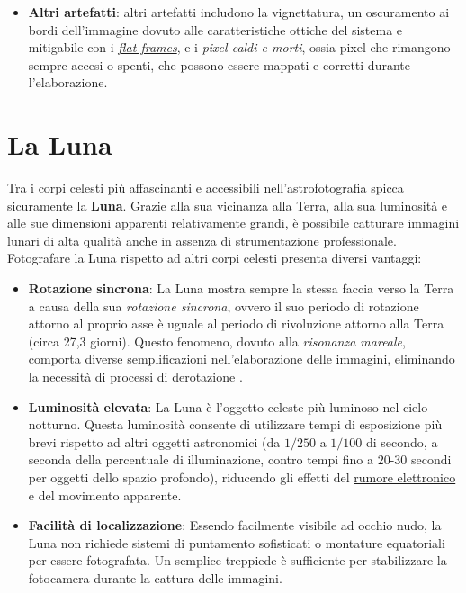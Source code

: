 \begin{itemize}
    \item \textbf{Altri artefatti}: altri artefatti includono la vignettatura, un oscuramento ai bordi dell'immagine dovuto alle caratteristiche ottiche del sistema e mitigabile con i \hyperref[subsec:flat]{\textit{flat frames}}, e i \textit{pixel caldi e morti},  ossia pixel che rimangono sempre accesi o spenti, che possono essere mappati e corretti durante l'elaborazione.

\end{itemize}

\section{La Luna} \label{sec:moon}

Tra i corpi celesti più affascinanti e accessibili nell'astrofotografia spicca sicuramente la \textbf{Luna}. Grazie alla sua vicinanza alla Terra, alla sua luminosità e alle sue dimensioni apparenti relativamente grandi, è possibile catturare immagini lunari di alta qualità anche in assenza di strumentazione professionale. Fotografare la Luna rispetto ad altri corpi celesti presenta diversi vantaggi:

\begin{itemize}
    \item \textbf{Rotazione sincrona}: La Luna mostra sempre la stessa faccia verso la Terra a causa della sua \textit{rotazione sincrona}, ovvero il suo periodo di rotazione attorno al proprio asse è uguale al periodo di rivoluzione attorno alla Terra (circa 27,3 giorni). Questo fenomeno, dovuto alla \textit{risonanza mareale}, comporta diverse semplificazioni nell'elaborazione delle immagini, eliminando la necessità di processi di derotazione \cite{nasa_moon_orbit}.
    
    \item \textbf{Luminosità elevata}: La Luna è l'oggetto celeste più luminoso nel cielo notturno. Questa luminosità consente di utilizzare tempi di esposizione più brevi rispetto ad altri oggetti astronomici (da $1/250$ a $1/100$ di secondo, a seconda della percentuale di illuminazione, contro tempi fino a $20$-$30$ secondi per oggetti dello spazio profondo), riducendo gli effetti del \hyperref[sec:noise]{rumore elettronico} e del movimento apparente.
    
    \item \textbf{Facilità di localizzazione}: Essendo facilmente visibile ad occhio nudo, la Luna non richiede sistemi di puntamento sofisticati o montature equatoriali per essere fotografata. Un semplice treppiede è sufficiente per stabilizzare la fotocamera durante la cattura delle immagini.
\end{itemize}

